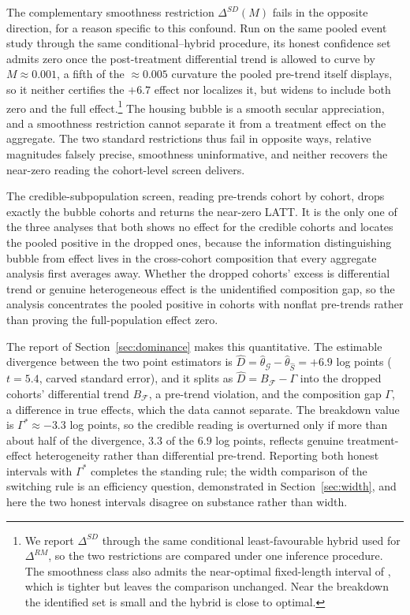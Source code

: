 \documentclass[12pt]{article}
\theoremstyle{remark}
\begin{document}
The complementary smoothness restriction $\Delta^{SD}(M)$ fails in the opposite direction, for a reason
specific to this confound. Run on the same pooled event study through the same conditional--hybrid procedure,
its honest confidence set admits zero once the post-treatment differential trend is allowed to curve by
$M\approx0.001$, a fifth of the $\approx\!0.005$ curvature the pooled pre-trend itself displays, so it
neither certifies the $+6.7$ effect nor localizes it, but widens to include both zero and the full
effect.\footnote{We report $\Delta^{SD}$ through the same conditional least-favourable hybrid used for
$\Delta^{RM}$, so the two restrictions are compared under one inference procedure. The smoothness class also
admits the near-optimal fixed-length interval of \citet{armstrong2018}, which is tighter but leaves the
comparison unchanged. Near the breakdown the identified set is small and the hybrid is close to optimal.}
The housing bubble is a smooth secular appreciation, and a smoothness restriction cannot separate it from a
treatment effect on the aggregate. The two standard restrictions thus fail in opposite ways, relative
magnitudes falsely precise, smoothness uninformative, and neither recovers the near-zero reading the
cohort-level screen delivers.

The credible-subpopulation screen, reading pre-trends cohort by cohort, drops exactly the bubble cohorts and
returns the near-zero LATT. It is the only one of the three analyses that both shows no effect for the
credible cohorts and locates the pooled positive in the dropped ones, because the information distinguishing
bubble from effect lives in the cross-cohort composition that every aggregate analysis first averages away.
Whether the dropped cohorts' excess is differential trend or genuine heterogeneous effect is the unidentified
composition gap, so the analysis concentrates the pooled positive in cohorts with nonflat pre-trends rather
than proving the full-population effect zero.

The report of Section~\ref{sec:dominance} makes this quantitative. The estimable divergence between the
two point estimators is $\hat D=\hat\theta_{\mathcal G}-\hat\theta_{\hat S}=+6.9$ log points ($t=5.4$,
carved standard error), and it splits as $\hat D=B_{\mathcal F}-\Gamma$ into the dropped cohorts'
differential trend $B_{\mathcal F}$, a pre-trend violation, and the composition gap $\Gamma$, a difference
in true effects, which the data cannot separate. The breakdown value is $\Gamma^\ast\approx-3.3$ log
points, so the credible reading is overturned only if more than about half of the divergence, $3.3$ of the
$6.9$ log points, reflects genuine treatment-effect heterogeneity rather than differential pre-trend.
Reporting both honest intervals with $\Gamma^\ast$ completes the standing rule; the width comparison of the
switching rule is an efficiency question, demonstrated in Section~\ref{sec:width}, and here the two honest
intervals disagree on substance rather than width.
\end{document}
